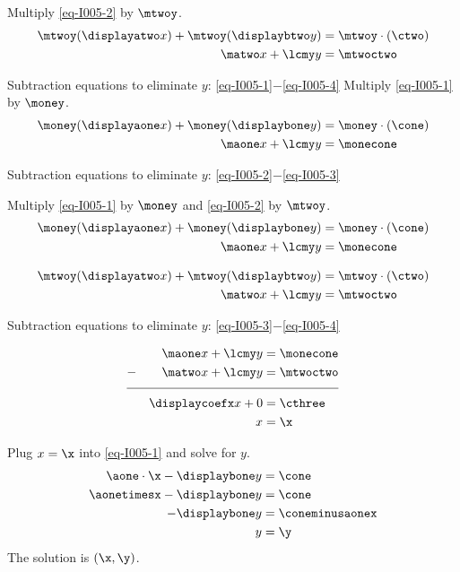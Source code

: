 \begin{solution}

 
\ifnum{}
	Multiply \eqref{eq-I005-2} by $\mtwoy$.
	\begin{align}
	\mtwoy(\displayatwo x) + \mtwoy(\displaybtwo y) &=\mtwoy\cdot(\ctwo) \nonumber \\
	\matwo x + \lcmy y &= \mtwoctwo \label{eq-I005-4}
	\end{align}

	Subtraction equations to eliminate $y$: \eqref{eq-I005-1}$-$\eqref{eq-I005-4} 
\else
	\ifnum{} 
		Multiply \eqref{eq-I005-1} by $\money$.
		\begin{align}
		\money(\displayaone x) + \money(\displaybone y) &=\money\cdot(\cone) \nonumber \\
		\maone x + \lcmy y &= \monecone \label{eq-I005-3}
		\end{align}
		
		Subtraction equations to eliminate $y$: \eqref{eq-I005-2}$-$\eqref{eq-I005-3} 

	\else
		Multiply \eqref{eq-I005-1} by $\money$ and \eqref{eq-I005-2} by $\mtwoy$.
		\begin{align}
		\money(\displayaone x) + \money(\displaybone y) &=\money\cdot(\cone) \nonumber \\
		\maone x + \lcmy y &= \monecone \label{eq-I005-3}
		\end{align}

		\begin{align}
		\mtwoy(\displayatwo x) + \mtwoy(\displaybtwo y) &=\mtwoy\cdot(\ctwo) \nonumber \\
		\matwo x + \lcmy y &= \mtwoctwo \label{eq-I005-4}
		\end{align}

		Subtraction equations to eliminate $y$: \eqref{eq-I005-3}$-$\eqref{eq-I005-4} 
	\fi
\fi


\begin{align}
&& \maone x + \lcmy y &= \monecone \nonumber \\
-&& \matwo x + \lcmy y &= \mtwoctwo  \nonumber\\[-0.5em]
\cline{1-4}
&& \displaycoefx x+0 &=\cthree \nonumber\\
&& x&=\x\nonumber
\end{align}



Plug $x=\x$ into \eqref{eq-I005-1} and solve for $y$.
\begin{align*}
\aone\cdot \x- \displaybone y &=\cone \\
\aonetimesx-\displaybone y&= \cone\\
-\displaybone y&= \coneminusaonex \\
y&=\y
\end{align*}
The solution is $(\x,\y)$. 

\end{solution}
